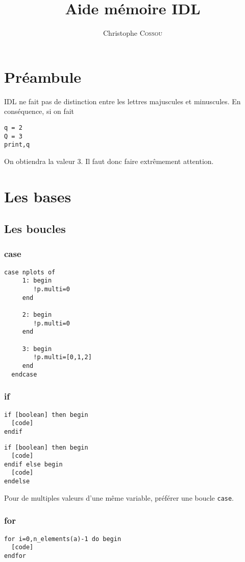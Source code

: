 \documentclass[a4paper,twoside]{article}
\title{Aide mémoire IDL}
\author{Christophe \textsc{Cossou}}
\begin{document}
\tableofcontents

\clearpage

\section{Préambule}
IDL ne fait pas de distinction entre les lettres majuscules et minuscules. En conséquence, si on fait
\begin{lstlisting}[language=IDL]
q = 2
Q = 3
print,q
\end{lstlisting}
On obtiendra la valeur $3$. Il faut donc faire extrêmement attention.


\section{Les bases}
\subsection{Les boucles}
\subsubsection{case}
\begin{lstlisting}[language=IDL]
  case nplots of
     1: begin
        !p.multi=0
     end

     2: begin
        !p.multi=0
     end

     3: begin
        !p.multi=[0,1,2]
     end
  endcase
\end{lstlisting}

\subsubsection{if}
\begin{lstlisting}[language=IDL]
if [boolean] then begin
  [code]
endif
\end{lstlisting}

\begin{lstlisting}[language=IDL]
if [boolean] then begin
  [code]
endif else begin
  [code]
endelse
\end{lstlisting}

Pour de multiples valeurs d'une même variable, préférer une boucle \texttt{case}.

\subsubsection{for}
\begin{lstlisting}[language=IDL]
for i=0,n_elements(a)-1 do begin
  [code]
endfor
\end{lstlisting}
\end{document}
